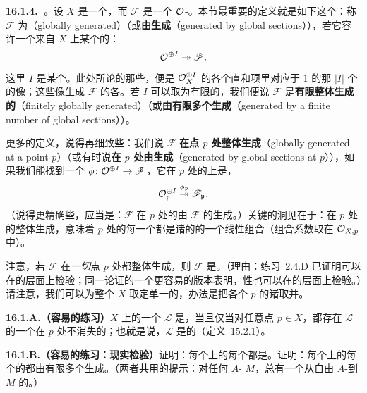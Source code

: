 \textbf{16.1.4.\ \trGloballyGenerated\trSheaf。}\quad 设 $X$ 是一个\trScheme，而 $\mathscr{F}$ 是一个 $\mathcal{O}$-\trModule。本节最重要的定义就是如下这个：称 $\mathscr{F}$ 为\textbf{\trGloballyGenerated}（globally generated）（或\textbf{由\trGlobalSections{}生成}（generated by global sections）），若它容许一个来自 $X$ 上某个\trFreeSheaf{}的\trSurjectiveMap：
\[
\mathcal{O}^{\oplus I}\twoheadrightarrow\mathscr{F}.
\]
这里 $I$ 是某个\trIndexSet。此处所论的那些\trGlobalSections，便是 $\mathcal{O}_X^{\oplus I}$ 的各个直和项里对应于 $1$ 的那 $|I|$ 个\trSection{}的像；这些像生成 $\mathscr{F}$ 的各\trStalk。若\trIndexSet{} $I$ 可以取为有限的，我们便说 $\mathscr{F}$ 是\textbf{有限整体生成的}（finitely globally generated）（或\textbf{由有限多个\trGlobalSections{}生成}（generated by a finite number of global sections））。

更多的定义，说得再细致些：我们说 $\mathscr{F}$ \textbf{在点 $p$ 处整体生成}（globally generated at a point $p$）（或有时说\textbf{在 $p$ 处由\trGlobalSections{}生成}（generated by global sections at $p$）），如果我们能找到一个 $\phi\colon\mathcal{O}^{\oplus I}\to\mathscr{F}$，它在 $p$ 处的\trStalk{}上是\trSurjectiveMap，
\[
\mathcal{O}_{\mathfrak{p}}^{\oplus I}\overset{\phi_{\mathfrak{p}}}{\twoheadrightarrow}\mathscr{F}_{\mathfrak{p}}.
\]
（说得更精确些，应当是：$\mathscr{F}$ 在 $p$ 处的\trStalk{}由 $\mathscr{F}$ 的\trGlobalSections{}生成。）关键的洞见在于：在 $p$ 处的整体生成，意味着 $p$ 处的每一个\trGerm{}都是诸\trGlobalSections{}的\trGerm{}的一个线性组合（组合系数取在\trLocalRing{} $\mathcal{O}_{X,p}$ 中）。

注意，若 $\mathscr{F}$ 在\emph{一切}点 $p$ 处都整体生成，则 $\mathscr{F}$ 是\emph{\trGloballyGenerated}。（理由：\mbox{练习~2.4.D} 已证明\trIsomorphism{}可以在\trStalk{}的层面上检验；同一论证的一个更容易的版本表明，\trSurjectiveMap{}性也可以在\trStalk{}的层面上检验。）请注意，我们可以为整个 $X$ 取定单一的\trIndexSet，办法是把各个 $p$ 的诸\trIndexSet{}取并。

\textbf{16.1.A.（容易的练习）}\quad $X$ 上的一个\trInvertibleSheaf{} $\mathscr{L}$ 是\trGloballyGenerated，当且仅当对任意点 $p\in X$，都存在 $\mathscr{L}$ 的一个在 $p$ 处不消失的\trSection；也就是说，$\mathscr{L}$ 是\trBasePointFree{}的（\mbox{定义~15.2.1}）。

\textbf{16.1.B.（容易的练习：现实检验）}\quad 证明：每个\trAffineScheme{}上的每个\trQCSheaf{}都是\trGloballyGenerated。证明：每个\trAffineScheme{}上的每个\trFiniteType{}的\trQCSheaf{}都由有限多个\trGlobalSections{}生成。（两者共用的提示：对任何 $A$-\trModule{} $M$，总有一个从自由 $A$-\trModule{}到 $M$ 的\trSurjectiveMap。）

